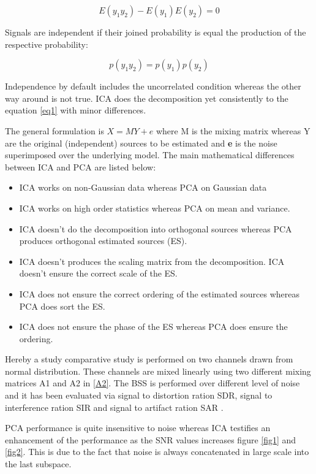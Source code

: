 \begin{equation}\label{equati1}
E(y_{1}y_{2})-E(y_{1})E(y_{2})=0
\end{equation}

Signals are independent if their joined probability is equal the production of the respective probability:

\begin{equation}\label{equati2}
p(y_{1}y_{2})=p(y_{1})p(y_{2})
\end{equation}

Independence by default includes the uncorrelated condition whereas the other way around is not true. ICA does the decomposition yet consistently to the equation \ref{eq1} with minor differences.

The general formulation is $X=MY+e$ where M is the mixing matrix whereas Y are the original (independent) sources to be estimated and \textbf{e} is the noise superimposed over the underlying model. 
The main mathematical differences between ICA and PCA are listed below:

\begin{itemize}
    \item ICA works on non-Gaussian data whereas PCA on Gaussian data
    \item ICA works on high order statistics whereas PCA on mean and variance.
    \item ICA doesn't do the decomposition into orthogonal sources whereas PCA produces orthogonal estimated sources (ES).
    \item ICA doesn't produces the scaling matrix from the decomposition. ICA doesn't ensure the correct scale of the ES. 
    \item ICA does not ensure the correct ordering of the estimated sources whereas PCA does sort the ES.
    \item ICA does not ensure the phase of the ES whereas PCA does ensure the ordering\cite{4}. 
\end{itemize}

Hereby a study comparative study is performed on two channels drawn from normal distribution. These channels are mixed linearly using two different mixing matrices A1 and A2 in \ref{A2}. The BSS is performed over different level of noise and it has been evaluated via signal to distortion ration SDR, signal to interference ration SIR and signal to artifact ration SAR \cite{6}. 

PCA performance is quite insensitive to noise whereas ICA testifies an enhancement of the performance as the SNR values increases figure \ref{fig1} and \ref{fig2}. This is due to the fact that noise is always concatenated in large scale into the last subspace.  

